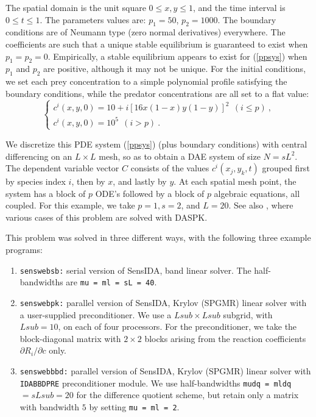 The spatial domain is the unit square $0 \leq x,y \leq 1$, and the
time interval is $0 \leq t \leq 1$.  
The parameters values are: $p_1 = 50$, $p_2 = 1000$.
The boundary conditions are of
Neumann type (zero normal derivatives) everywhere.  The coefficients
are such that a unique stable equilibrium is guaranteed to exist when
$p_1 = p_2 = 0$.  Empirically, a stable equilibrium
appears to exist for (\ref{ppsys}) when $p_1$ and $p_2$ are
positive, although it may not be unique. 
For the initial conditions, we set each prey concentration to a simple
polynomial profile satisfying the boundary conditions, while the
predator concentrations are all set to a flat value:
\[
\left\{ \begin{array}{l}
c^i(x,y,0) = 10 + i [16x(1 - x)y(1 - y)]^2 ~~ (i \leq p) ~, \\
c^i(x,y,0) = 10^5 ~~ (i > p) ~.
\end{array} \right.
\]

We discretize this PDE system (\ref{ppsys}) (plus boundary conditions)
with central differencing on an $L \times L$ mesh, so as to obtain a
DAE system of size $N = s L^2$.  The dependent variable vector $C$
consists of the values $c^i(x_j,y_k,t)$ grouped first by species index
$i$, then by $x$, and lastly by $y$.  At each spatial mesh point, the
system has a block of $p$ ODE's followed by a block of $p$ algebraic
equations, all coupled.
For this example, we take $p = 1, s = 2$, and $L = 20$.  See also 
\cite{BHP98}, where various cases of this problem are solved with DASPK.

This problem was solved in three different ways, with the following
three example programs:
\begin{enumerate}
\item {\tt senswebsb:} serial version of SensIDA, band linear solver.
The half-bandwidths are {\tt mu = ml = sL = 40}.
\item {\tt senswebpk:} parallel version of SensIDA, Krylov (SPGMR)
linear solver with a user-supplied preconditioner.
We use a $Lsub \times Lsub$ subgrid, with $Lsub = 10$, on each of four
processors.
For the preconditioner, we take the block-diagonal matrix with $2
\times 2$ blocks arising from the reaction coefficients $\partial R_i
/ \partial c$ only.
\item {\tt senswebbbd:} parallel version of SensIDA, Krylov (SPGMR)
linear solver with {\tt IDABBDPRE} preconditioner module.
We use half-bandwidths {\tt mudq = mldq} $= s Lsub = 20$ for the
difference quotient scheme, but retain only a matrix with bandwidth
$5$ by setting {\tt mu = ml = 2}.
\end{enumerate}

